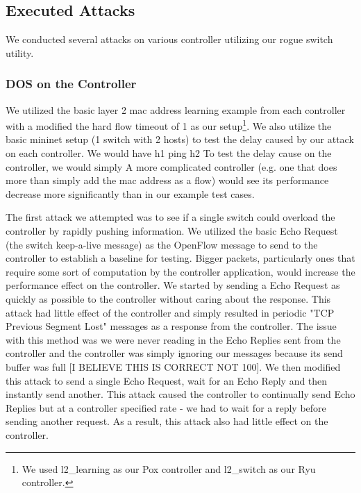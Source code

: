 
\subsection{Executed Attacks} 

We conducted several attacks on various controller utilizing our rogue switch utility. 

 \subsubsection{DOS on the Controller}
We utilized the basic layer 2 mac address learning example from each controller with a modified the hard flow timeout of 1 as our setup\footnote{We used l2\_learning as our Pox controller and l2\_switch as our Ryu controller.}. We also utilize the basic mininet setup (1 switch with 2 hosts) to test the delay caused by our attack on each controller. We would have h1 ping h2 To test the delay cause on the controller, we would simply A more complicated controller (e.g. one that does more than simply add the mac address as a flow) would see its performance decrease more significantly than in our example test cases.

 The first attack we attempted was to see if a single switch could overload the controller by rapidly pushing information. We utilized the basic Echo Request (the switch keep-a-live message) as the OpenFlow message to send to the controller to establish a baseline for testing. Bigger packets, particularly ones that require some sort of computation by the controller application, would increase the performance effect on the controller. We started by sending a Echo Request as quickly as possible to the controller without caring about the response. This attack had little effect of the controller and simply resulted in periodic "TCP Previous Segment Lost" messages as a response from the controller. The issue with this method was we were never reading in the Echo Replies sent from the controller and the controller was simply ignoring our messages because its send buffer was full [I BELIEVE THIS IS CORRECT NOT 100]. We then modified this attack to send a single Echo Request, wait for an Echo Reply and then instantly send another. This attack caused the controller to continually send Echo Replies but at a controller specified rate - we had to wait for a reply before sending another request. As a result, this attack also had little effect on the controller.

